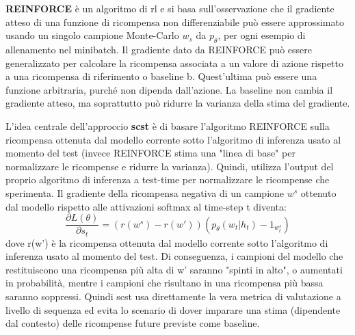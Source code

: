\textbf{REINFORCE} \cite{rennie2017self} è un algoritmo di \acrlong{rl} e si basa sull'osservazione che il gradiente atteso di una funzione di ricompensa non differenziabile può essere approssimato usando un singolo campione Monte-Carlo $w_s$ da $p_\theta$, per ogni esempio di allenamento nel minibatch. Il gradiente dato da REINFORCE può essere generalizzato per calcolare la ricompensa associata a un valore di azione rispetto a una ricompensa di riferimento o baseline b. Quest'ultima può essere una funzione arbitraria, purché non dipenda dall'azione. La baseline non cambia il gradiente atteso, ma soprattutto può ridurre la varianza della stima del gradiente. 

L'idea centrale dell'approccio \textbf{\acrshort{scst}} è di basare l'algoritmo REINFORCE sulla ricompensa ottenuta dal modello corrente sotto l'algoritmo di inferenza usato al momento del test (invece REINFORCE stima una "linea di base" per normalizzare le ricompense e ridurre la varianza). Quindi, utilizza l'output del proprio algoritmo di inferenza a test-time per normalizzare le ricompense che sperimenta. Il gradiente della ricompensa negativa di un campione $w^s$ ottenuto dal modello rispetto alle attivazioni softmax al time-step t diventa:
\begin{equation*}
\frac{\partial L(\theta)}{\partial	s_t} = (r(w^s) - r(w'))(p_\theta(w_t|h_t) - 1_{w_t^s})
\end{equation*}
dove r(w') è la ricompensa ottenuta dal modello corrente sotto l'algoritmo di inferenza usato al momento del test. Di conseguenza, i campioni del modello che restituiscono una ricompensa più alta di w' saranno "spinti in alto", o aumentati in probabilità, mentre i campioni che risultano in una ricompensa più bassa saranno soppressi.
Quindi \acrshort{scst} usa direttamente la vera metrica di valutazione a livello di sequenza ed evita lo scenario di dover imparare una stima (dipendente dal contesto) delle ricompense future previste come baseline. 


